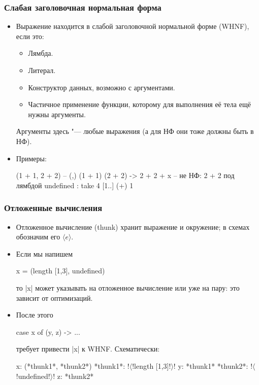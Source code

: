 \documentclass[11pt]{beamer}
\begin{document}
\begin{frame}[fragile]
  \frametitle{Слабая заголовочная нормальная форма}
  \begin{itemize}
    \item Выражение находится в слабой заголовочной нормальной форме (WHNF), если это:
          \begin{itemize}
            \item Лямбда.
            \item Литерал.
            \item Конструктор данных, возможно с аргументами.
            \item Частичное применение функции, которому для выполнения её тела ещё нужны аргументы.
          \end{itemize}
          Аргументы здесь "--- любые выражения \pause
          (а для НФ они тоже должны быть в НФ).
    \item Примеры: \pause
          \begin{haskellsmall}
            (1 + 1, 2 + 2)       -- (,) (1 + 1) (2 + 2)
            \x -> 2 + 2 + x      -- не НФ: 2 + 2 под лямбдой
            undefined : take 4 [1..]
            (+) 1
          \end{haskellsmall}
  \end{itemize}
\end{frame}

\begin{frame}[fragile]
  \frametitle{Отложенные вычисления}
  \begin{itemize}
    \item Отложенное вычисление (thunk) хранит выражение и окружение; в схемах обозначим его $\langle e\rangle$.
    \item Если мы напишем
          \begin{haskell}
            x = (length [1,3], undefined)
          \end{haskell}
          то \haskinline|x| может указывать на отложенное вычисление или уже на пару: это зависит от оптимизаций.
    \item После этого
          \begin{haskell}
            case x of
              (y, z) -> ...
          \end{haskell}
          требует привести \haskinline|x| к WHNF. Схематически: \pause
          \begin{haskell}
            x: (*thunk1*, *thunk2*)  *thunk1*: !$\langle$!length [1,3]!$\rangle$!
            y: *thunk1*              *thunk2*: !$\langle$!undefined!$\rangle$!
            z: *thunk2*
          \end{haskell}

  \end{itemize}
\end{frame}
\end{document}
